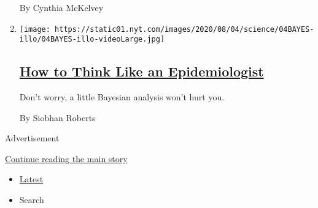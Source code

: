 \begin{enumerate}
  By Cynthia McKelvey
\item
  \texttt{[image: https://static01.nyt.com/images/2020/08/04/science/04BAYES-illo/04BAYES-illo-videoLarge.jpg]}

  \hypertarget{how-to-think-like-an-epidemiologist}{%
  \subsection{\texorpdfstring{\href{/2020/08/04/science/coronavirus-bayes-statistics-math.html}{How
  to Think Like an
  Epidemiologist}}{How to Think Like an Epidemiologist}}\label{how-to-think-like-an-epidemiologist}}

  Don't worry, a little Bayesian analysis won't hurt you.

  By Siobhan Roberts
\end{enumerate}

Advertisement

\protect\hyperlink{after-mid1}{Continue reading the main story}

\begin{itemize}
\tightlist
\item
  \protect\hyperlink{stream-panel}{Latest}
\item
  Search
\end{itemize}

